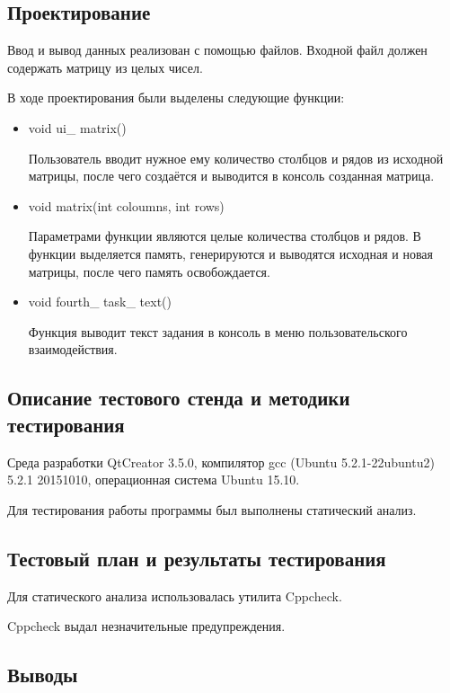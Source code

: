 \documentclass[12pt,a4paper]{report}
\begin{document}
\subsection{Проектирование}

Ввод и вывод данных реализован с помощью файлов. Входной файл должен содержать матрицу из целых чисел. 
 
В ходе проектирования были выделены следующие функции:

\begin{itemize}
 	
 	\item void ui\_ matrix()
 	
 	Пользователь вводит нужное ему количество столбцов и рядов из исходной матрицы, после чего создаётся и выводится в консоль созданная матрица.
 	
 	\item void matrix(int coloumns, int rows)
 	
 	Параметрами функции являются целые количества столбцов и рядов.
 	В функции выделяется память, генерируются и выводятся исходная и новая матрицы, после чего память освобождается.
 	
 	\item void fourth\_ task\_ text()
	
	Функция выводит текст задания в консоль в меню пользовательского взаимодействия.
 	
 	
\end{itemize}
	
\subsection{Описание тестового стенда и методики тестирования}
Среда разработки QtCreator 3.5.0, компилятор gcc (Ubuntu 5.2.1-22ubuntu2) 5.2.1 20151010, операционная система Ubuntu 15.10.

Для тестирования работы программы был выполнены статический анализ.
\subsection{Тестовый план и результаты тестирования}

Для статического анализа использовалась утилита Cppcheck.

\vspace{\baselineskip}
Cppcheck выдал незначительные предупреждения.

\subsection{Выводы}
\end{document}
